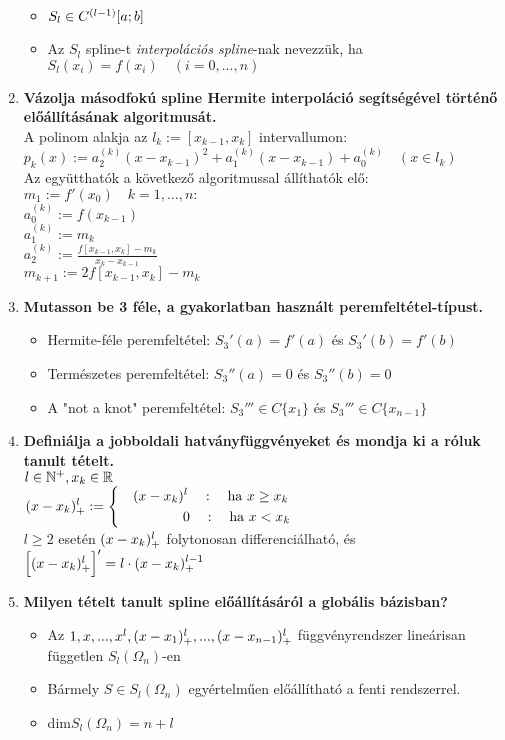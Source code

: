 \documentclass{article}
\begin{document}
\begin{enumerate}
\begin{itemize}
		\item{\Large $S_l\in C^{(l-1)}[a;b]$}
		\item Az $S_l$ spline-t \textit{interpolációs spline}-nak nevezzük, ha
		{\Large $S_l(x_i)=f(x_i)\quad(i=0,...,n)$}
	\end{itemize}
	\newpage
	\item\textbf{Vázolja másodfokú spline Hermite interpoláció segítségével történő előállításának algoritmusát.}\\[0.1cm]
	A polinom alakja az $l_k:=[x_{k-1},x_k]$ intervallumon:\\[0.1cm]
	{\Large $p_k(x):=a_2^{(k)}(x-x_{k-1})^2+a_1^{(k)}(x-x_{k-1})+a_0^{(k)}\quad
	(x\in l_k)$}\\[0.2cm]Az együtthatók a következő algoritmussal állíthatók elő:
	\\[0.1cm]$m_1:=f'(x_0)\quad k=1,...,n:$\\[0.2cm]
	{\Large $a_0^{(k)}:=f(x_{k-1})$}\\[0.2cm]
	{\Large $a_1^{(k)}:=m_k$}\\[0.2cm]
	{\Large $a_2^{(k)}:=\frac{f[x_{k-1},x_k]-m_k}{x_k-x_{k-1}}$}\\[0.2cm]
	{\Large $m_{k+1}:=2f[x_{k-1},x_k]-m_k$}
	\item\textbf{Mutasson be 3 féle, a gyakorlatban használt peremfeltétel-típust.}
	\begin{itemize}
		\item Hermite-féle peremfeltétel: $S_3'(a)=f'(a)$ és $S_3'(b)=f'(b)$
		\item Természetes peremfeltétel: $S_3''(a)=0$ és $S_3''(b)=0$
		\item A "not a knot" peremfeltétel: $S_3'''\in C\{x_1\}$ és $S_3'''\in
		C\{x_{n-1}\}$
	\end{itemize}
	\item\textbf{Definiálja a jobboldali hatványfüggvényeket és mondja ki a róluk tanult tételt.}\\[0.2cm]
	$l\in\mathbb{N}^+,x_k\in\mathbb{R}$\\[0.4cm]
	$\displaystyle (x-x_k)_{+}^{l}:= 
	\left\{
	\begin{gathered}
	\quad (x-x_k)^l\quad:\quad\text{ha }x\geq x_k\hspace{5.7cm} \\
	\quad 0\quad:\quad\text{ha }x<x_k\hspace{4.4cm}
	\end{gathered}\right.$\\[0.4cm]
	$l\geq 2$ esetén $(x-x_k)_{+}^{l}$ folytonosan differenciálható, és\\[0.2cm]
	{\Large $\Big[(x-x_k)_{+}^{l}\Big]'=l\cdot(x-x_k)_{+}^{l-1}$}
	\item\textbf{Milyen tételt tanult spline előállításáról a globális bázisban?}
	\begin{itemize}
		\item Az $1,x,...,x^l,(x-x_1)_{+}^{l},...,(x-x_{n-1})_{+}^{l}$ függvényrendszer
		lineárisan független $S_l(\Omega_n)$-en
		\item Bármely $S\in S_l(\Omega_n)$ egyértelműen előállítható a fenti rendszerrel.
		\item dim$S_l(\Omega_n)=n+l$
	\end{itemize}
\end{enumerate}
\end{document}
